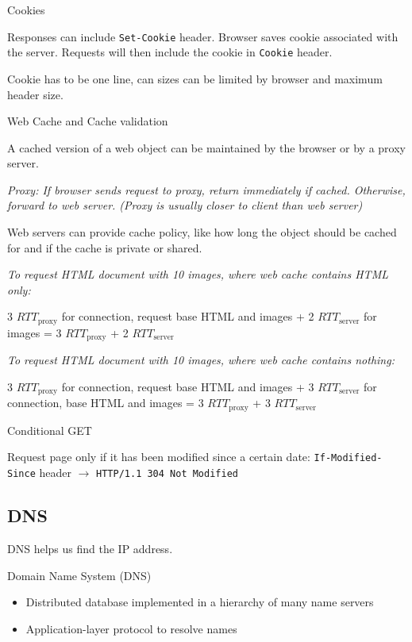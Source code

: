 \begin{definition}
    {Cookies}

    Responses can include \texttt{Set-Cookie} header. Browser saves cookie associated with the server. Requests will then include the cookie in \texttt{Cookie} header.

    Cookie has to be one line, can sizes can be limited by browser and maximum header size.
\end{definition}

\begin{definition}
    {Web Cache and Cache validation}

    A cached version of a web object can be maintained by the browser or by a proxy server.

    \textit{Proxy: If browser sends request to proxy, return immediately if cached. Otherwise, forward to web server. (Proxy is usually closer to client than web server)}

    Web servers can provide cache policy, like how long the object should be cached for and if the cache is private or shared.

    \tcblower

    \textit{To request HTML document with 10 images, where web cache contains HTML only:}

    3 $RTT_\text{proxy}$ for connection, request base HTML and images + 2 $RTT_\text{server}$ for images = 3 $RTT_\text{proxy}$ + 2 $RTT_\text{server}$

    \textit{To request HTML document with 10 images, where web cache contains nothing:}

    3 $RTT_\text{proxy}$ for connection, request base HTML and images + 3 $RTT_\text{server}$ for connection, base HTML and images = 3 $RTT_\text{proxy}$ + 3 $RTT_\text{server}$
\end{definition}

\begin{theorem}
    {Conditional GET}

    Request page only if it has been modified since a certain date: \texttt{If-Modified-Since} header $\to$ \texttt{HTTP/1.1 304 Not Modified}
\end{theorem}

\subsection{DNS}

DNS helps us find the IP address.

\begin{definition}
    {Domain Name System (DNS)}

    \begin{itemize}
        \item Distributed database implemented in a hierarchy of many name servers
        \item Application-layer protocol to resolve names
    \end{itemize}
\end{definition}

